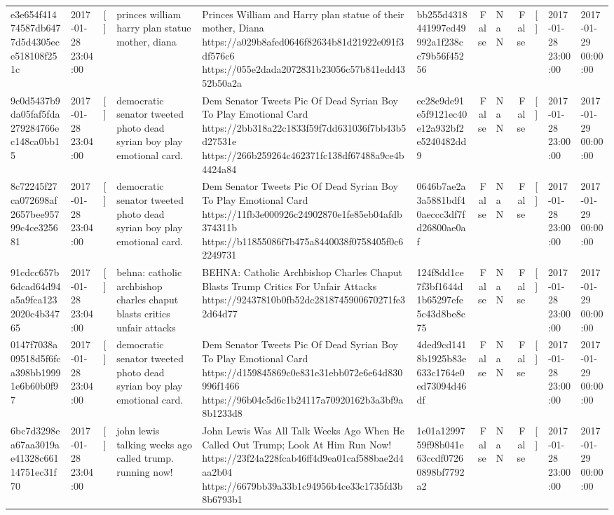 \begin{tabular}{llllllrlrlll}
e3e654f41474587db6477d5d4305ece518108f251c & 2017-01-28 23:04:00 & [] & princes william harry plan statue mother, diana & Princes William and Harry plan statue of their mother, Diana https://a029b8afed0646f82634b81d21922e091f3df576c6 https://055e2dada2072831b23056c57b841edd4352b50a2a & bb255d4318441997ed49992a1f238cc79b56f45256 & False & NaN & False & [] & 2017-01-28 23:00:00 & 2017-01-29 00:00:00 \\
9c0d5437b9da05faf5fda279284766ec148ca0bb15 & 2017-01-28 23:04:00 & [] & democratic senator tweeted photo dead syrian boy play emotional card. & Dem Senator Tweets Pic Of Dead Syrian Boy To Play Emotional Card https://2bb318a22c1833f59f7dd631036f7bb43b5d27531e https://266b259264c462371fc138df67488a9ce4b4424a84 & ec28e9de91e5f9121ec40e12a932bf2e5240482dd9 & False & NaN & False & [] & 2017-01-28 23:00:00 & 2017-01-29 00:00:00 \\
8c72245f27ca072698af2657bee95799c4ce325681 & 2017-01-28 23:04:00 & [] & democratic senator tweeted photo dead syrian boy play emotional card. & Dem Senator Tweets Pic Of Dead Syrian Boy To Play Emotional Card https://11fb3e000926c24902870e1fe85eb04afdb374311b https://b11855086f7b475a8440038f0758405f0c62249731 & 0646b7ae2a3a5881bdf40aeccc3df7fd26800ae0af & False & NaN & False & [] & 2017-01-28 23:00:00 & 2017-01-29 00:00:00 \\
91cdcc657b6dcad64d94a5a9fca1232020c4b34765 & 2017-01-28 23:04:00 & [] & behna: catholic archbishop charles chaput blasts critics unfair attacks & BEHNA: Catholic Archbishop Charles Chaput Blasts Trump Critics For Unfair Attacks https://92437810b0fb52dc2818745900670271fe32d64d77 & 124f8dd1ce7f3bf1644d1b65297efe5c43d8be8c75 & False & NaN & False & [] & 2017-01-28 23:00:00 & 2017-01-29 00:00:00 \\
0147f7038a09518d5f6fca398bb19991e6b60b0f97 & 2017-01-28 23:04:00 & [] & democratic senator tweeted photo dead syrian boy play emotional card. & Dem Senator Tweets Pic Of Dead Syrian Boy To Play Emotional Card https://d159845869c0e831e31ebb072e6e64d830996f1466 https://96b04c5d6c1b24117a70920162b3a3bf9a8b1233d8 & 4ded9cd1418b1925b83e633c1764e0ed73094d46df & False & NaN & False & [] & 2017-01-28 23:00:00 & 2017-01-29 00:00:00 \\
6bc7d3298ea67aa3019ae41328c66114751ec31f70 & 2017-01-28 23:04:00 & [] & john lewis talking weeks ago called trump. running now! & John Lewis Was All Talk Weeks Ago When He Called Out Trump; Look At Him Run Now! https://23f24a228fcab46ff4d9ea01caf588bae2d4aa2b04 https://6679bb39a33b1c94956b4ce33c1735fd3b8b6793b1 & 1e01a1299759f98b041e63ccdf07260898bf7792a2 & False & NaN & False & [] & 2017-01-28 23:00:00 & 2017-01-29 00:00:00 \\

\end{tabular}
